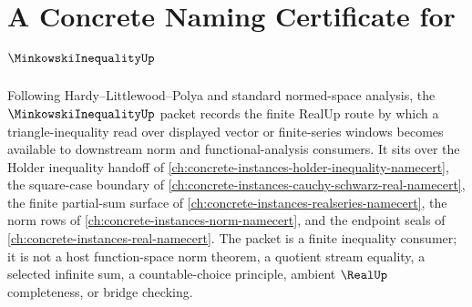 \chapter{A Concrete Naming Certificate for $\MinkowskiInequalityUp$}
\label{ch:concrete-instances-minkowski-inequality-namecert}

Following Hardy--Littlewood--Polya and standard normed-space analysis, the $\MinkowskiInequalityUp$ packet records the finite RealUp route by which a triangle-inequality read over displayed vector or finite-series windows becomes available to downstream norm and functional-analysis consumers. It sits over the Holder inequality handoff of \autoref{ch:concrete-instances-holder-inequality-namecert}, the square-case boundary of \autoref{ch:concrete-instances-cauchy-schwarz-real-namecert}, the finite partial-sum surface of \autoref{ch:concrete-instances-realseries-namecert}, the norm rows of \autoref{ch:concrete-instances-norm-namecert}, and the endpoint seals of \autoref{ch:concrete-instances-real-namecert}. The packet is a finite inequality consumer; it is not a host function-space norm theorem, a quotient stream equality, a selected infinite sum, a countable-choice principle, ambient $\RealUp$ completeness, or bridge checking.

